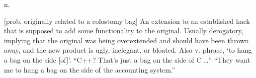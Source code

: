  n.

[prob. originally related to a colostomy bag] An extension to an established
hack that is supposed to add some functionality to the original. Usually
derogatory, implying that the original was being overextended and should have
been thrown away, and the new product is ugly, inelegant, or bloated. Also v.
phrase, `to hang a bag on the side [of]'. ``C++? That's just a bag on the side
of C \ldots'' ``They want me to hang a bag on the side of the accounting
system.''

